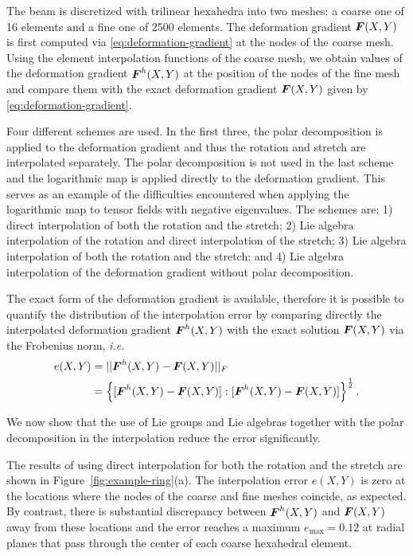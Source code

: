 \documentclass[12pt]{article}
\begin{document}
The beam is discretized with trilinear hexahedra into two meshes: a
coarse one of 16 elements and a fine one of 2500 elements. The
deformation gradient ${\boldsymbol{F}}(X,Y)$ is first computed via
\eqref{eq:deformation-gradient} at the nodes of the coarse mesh. Using
the element interpolation functions of the coarse mesh, we obtain
values of the deformation gradient ${\boldsymbol{F}}^{h}(X,Y)$ at the position of
the nodes of the fine mesh and compare them with the exact deformation
gradient ${\boldsymbol{F}}(X,Y)$ given by \eqref{eq:deformation-gradient}.

Four different schemes are used. In the first three, the polar decomposition is
applied to the deformation gradient and thus the rotation and stretch are
interpolated separately. The polar decomposition is not used in the last scheme
and the logarithmic map is applied directly to the deformation gradient. This
serves as an example of the difficulties encountered when applying the
logarithmic map to tensor fields with negative eigenvalues. The schemes are:
1) direct interpolation of both the rotation and the stretch; 2) Lie algebra
interpolation of the rotation and direct interpolation of the stretch; 3) Lie
algebra interpolation of both the rotation and the stretch; and 4) Lie algebra
interpolation of the deformation gradient without polar decomposition.

The exact form of the deformation gradient is available, therefore it
is possible to quantify the distribution of the interpolation error by
comparing directly the interpolated deformation gradient
${\boldsymbol{F}}^{h}(X,Y)$ with the exact solution ${\boldsymbol{F}}(X,Y)$ via the Frobenius
norm, \emph{i.e.}
\begin{align}
  e(X,Y) & =
  ||{\boldsymbol{F}}^{h}(X,Y) - {\boldsymbol{F}}(X,Y)||_{F} \nonumber
  \\
  & =
  \left\{
    [{\boldsymbol{F}}^{h}(X,Y) - {\boldsymbol{F}}(X,Y)] : [{\boldsymbol{F}}^{h}(X,Y)- {\boldsymbol{F}}(X,Y)]
  \right\}^{\frac{1}{2}}.
  \label{eq:Frobenius-norm-distribution}
\end{align} 

We now show that the use of Lie groups and Lie algebras together with the
polar decomposition in the interpolation reduce the error significantly.

The results of using direct interpolation for both the rotation and the stretch
are shown in Figure~\ref{fig:example-ring}(a). The interpolation error $e(X,Y)$
is zero at the locations where the nodes of the coarse and fine meshes coincide,
as expected. By contrast, there is substantial discrepancy between
${\boldsymbol{F}}^{h}(X,Y)$ and ${\boldsymbol{F}}(X,Y)$ away from these locations and the error reaches a
maximum $e_{\text{max}} = 0.12$ at radial planes that pass through the center of
each coarse hexahedral element.
\end{document}
